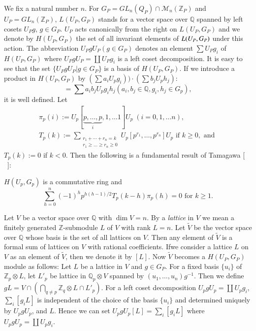 We fix a natural number $n$. For $G_{P}=GL_{n}(Q_{P})\cap
\mathscr{M}_{n}(\mathbb{Z}_{P})$ and $U_{P}=GL_{n}(\mathbb{Z}_{P})$,
$L(U_{P},G_{P})$ stands for a vector space over $\mathbb{Q}$ spanned
by left cosets $U_{P}g$, $g\in G_{P}$. $U_{P}$ acts canonically from
the right on $L(U_{P},G_{P})$ and we denote by $H(U_{P},G_{P})$ the
set of all invariant elements of $L(U_{P},\break G_{P})$ under this
action. The abbreviation $U_{P}gU_{P}(g\in G_{P})$ denotes an element
$\sum U_{P}g_{i}$ of $H(U_{P},G_{P})$ where $U_{P}gU_{P}=\coprod
U_{P}g_{i}$ is a left coset decomposition. It is easy to see that the
set $\{U_{P}gU_{P}|g\in G_{P}\}$ is a basis of $H(U_{P},G_{P})$. If we
introduce a product in $H(U_{P},G_{P})$ by $(\sum
a_{i}U_{p}g_{i}))\cdot (\sum b_{j}U_{p}h_{j})$:
$$
=\sum a_{i}b_{j}U_{p}g_{i}h_{j}(a_{i},b_{j}\in\mathbb{Q},
g_{i},h_{j}\in G_{p}), 
$$
it is well defined. Let
\begin{gather*}
\pi_{p}(i):=U_{p}[\underbrace{p,\ldots,p}_{i},1,\ldots 1]U_{p} \;
(i=0,1,\ldots n),\\
T_{p}(k):=\sum_{\substack{r_{1}+\cdots+r_{n}=k\\ r_{1}\geq\ldots\geq
    r_{n}\geq 0}}U_{p}[p^{r_{1}},\ldots,p^{r_{n}}]U_{p}\text{ \ if \ }
k\geq 0, \text{ \ and \ }
\end{gather*}
$T_{p}(k):=0$ if $k<0$. Then the following is a fundamental result of
Tamagawa [ \ ]:

\begin{sublemma}\label{c1:lem-1.7.1}
$H(U_{p},G_{p})$ is a commutative ring and
$$
\sum^{n}_{h=0}(-1)^{h}p^{h(h-1)/2}T_{p}(k-h)\pi_{p}(h)=0\text{ \ for
  \ } k\geq 1.
$$
\end{sublemma}

Let $V$ be a vector space over $\mathbb{Q}$ with $\dim V=n$. By a {\em
  lattice} in $V$ we mean a finitely generated $\mathbb{Z}$-submodule
$L$ of $V$ with rank $L=n$. Let $\tilde{V}$ be the vector space
over $\mathbb{Q}$ whose basis is the set of all lattices on $V$. Then
any element of $\tilde{V}$ is a formal sum of lattices on $V$ with
rational coefficients. If\pageoriginale we consider a lattice $L$ on
$V$ as an element of $\tilde{V}$, then we denote it by $[L]$. Now
$\tilde{V}$ becomes a $H(U_{P},G_{P})$ module as follows: Let $L$
be a lattice in $V$ and $g\in G_{P}$. For a fixed basis $\{u_{i}\}$ of
$\mathbb{Z}_{p}\otimes L$, let $L'_{p}$ be lattice in
$\mathbb{Q}_{p}\otimes V$ spanned by
$(u_{1},\ldots,u_{n})g^{-1}$. Then we define $gL=V\cap
(\bigcap\limits_{q\neq p}\mathbb{Z}_{q}\otimes L\cap L'_{p})$. For a
left coset decomposition $U_{p}gU_{p}=\coprod U_{p}g_{i}$,
$\sum_{i}[g_{i}L]$ is independent of the choice of the basis
$\{u_{i}\}$ and determined uniquely by $U_{p}gU_{p}$, and $L$. Hence
we can set $U_{p}gU_{p}[L]=\sum\limits_{i}[g_{i}L]$ where
$U_{p}gU_{p}=\coprod U_{p}g_{i}$.

